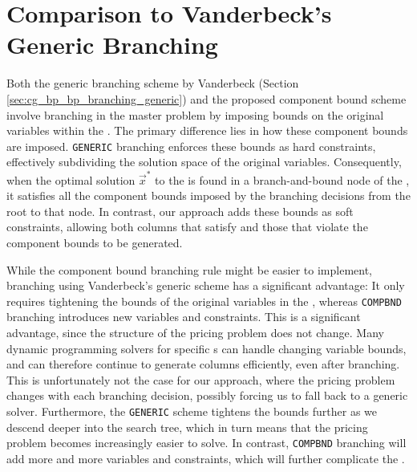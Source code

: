 \section{Comparison to Vanderbeck's Generic Branching}\label{sec:cmpbnd_simdif}
Both the generic branching scheme by Vanderbeck (Section \ref{sec:cg_bp_bp_branching_generic}) and the proposed component bound scheme involve branching in the master problem by imposing bounds on the original variables within the \SP{}. The primary difference lies in how these component bounds are imposed. \texttt{GENERIC} branching enforces these bounds as hard constraints, effectively subdividing the solution space of the original variables. Consequently, when the optimal solution $\vec{x}^*$ to the \IP{} is found in a branch-and-bound node of the \RMP{}, it satisfies all the component bounds imposed by the branching decisions from the root to that node. In contrast, our approach adds these bounds as soft constraints, allowing both columns that satisfy and those that violate the component bounds to be generated.

While the component bound branching rule might be easier to implement, branching using Vanderbeck's generic scheme has a significant advantage: It only requires tightening the bounds of the original variables in the \SP{}, whereas \texttt{COMPBND} branching introduces new variables and constraints. This is a significant advantage, since the structure of the pricing problem does not change. Many dynamic programming solvers for specific \IP{}s can handle changing variable bounds, and can therefore continue to generate columns efficiently, even after branching. This is unfortunately not the case for our approach, where the pricing problem changes with each branching decision, possibly forcing us to fall back to a generic \MIP{} solver. Furthermore, the \texttt{GENERIC} scheme tightens the bounds further as we descend deeper into the search tree, which in turn means that the pricing problem becomes increasingly easier to solve. In contrast, \texttt{COMPBND} branching will add more and more variables and constraints, which will further complicate the \SP{}.
